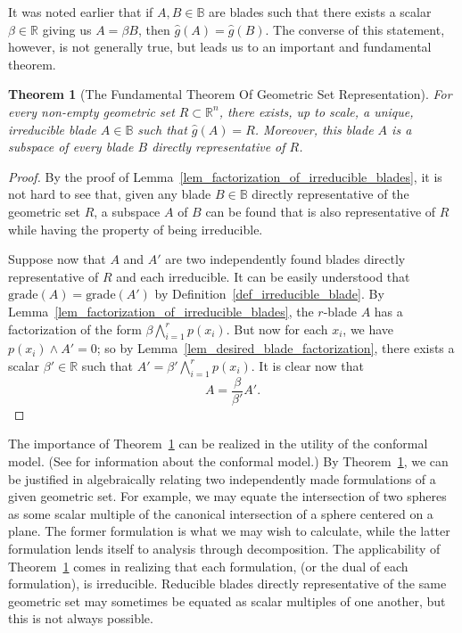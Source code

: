 \documentclass{birkjour}
\newtheorem{thm}{Theorem}[section]
\theoremstyle{definition}
\theoremstyle{remark}
\numberwithin{equation}{section}
\newcommand{\R}{\mathbb{R}}
\newcommand{\B}{\mathbb{B}}
\newcommand{\gh}{\hat{g}}
\newcommand{\grade}{\mbox{grade}}
\begin{document}
It was noted earlier that if $A,B\in\B$ are blades such that there exists a scalar $\beta\in\R$ giving us
$A=\beta B$, then $\gh(A)=\gh(B)$.  The converse of this statement, however,
is not generally true, but leads us to an important and fundamental theorem.

\begin{thm}[The Fundamental Theorem Of Geometric Set Representation]\label{thm_geo_set_rep}
For every non-empty geometric set $R\subset\R^n$, there exists, up to scale, a unique,
irreducible blade $A\in\B$ such that $\gh(A)=R$.  Moreover, this blade $A$ is a
subspace of every blade $B$ directly representative of $R$.
\end{thm}
\begin{proof}
By the proof of Lemma~\ref{lem_factorization_of_irreducible_blades}, it is not hard to see that, given any blade $B\in\B$ directly
representative of the geometric set $R$, a subspace $A$ of $B$ can be found that is
also representative of $R$ while having the property of being irreducible.

Suppose now that $A$ and $A'$ are two independently found blades directly representative of $R$
and each irreducible.  It can be easily understood that $\grade(A)=\grade(A')$ by Definition~\ref{def_irreducible_blade}.
By Lemma~\ref{lem_factorization_of_irreducible_blades}, the $r$-blade $A$ has a factorization
of the form $\beta\bigwedge_{i=1}^r p(x_i)$.  But now for each $x_i$, we have $p(x_i)\wedge A'=0$; so by
Lemma~\ref{lem_desired_blade_factorization}, there exists a scalar $\beta'\in\R$ such that $A'=\beta'\bigwedge_{i=1}^r p(x_i)$.
It is clear now that
\begin{equation}
A = \frac{\beta}{\beta'}A'.
\end{equation}
\end{proof}

The importance of Theorem~\ref{thm_geo_set_rep} can be realized
in the utility of the conformal model.  (See \cite{Dorst07} for information about the conformal model.)
By Theorem~\ref{thm_geo_set_rep}, we can be justified in algebraically
relating two independently made formulations
of a given geometric set.  For example, we may equate the intersection of two spheres as some
scalar multiple of the canonical intersection of a sphere centered on a plane.  The former formulation
is what we may wish to calculate, while the latter formulation lends itself to analysis through decomposition.
The applicability of Theorem~\ref{thm_geo_set_rep} comes in realizing that each formulation, (or the
dual of each formulation), is irreducible.
Reducible blades directly representative of the same geometric set may sometimes be equated as scalar multiples
of one another, but this is not always possible.
\end{document}
